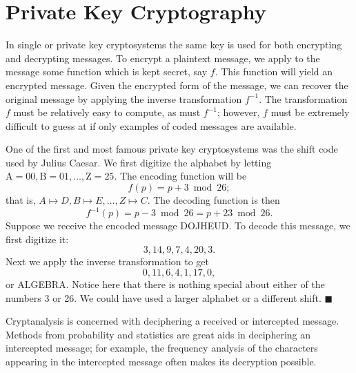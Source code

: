 
 
\section{Private Key Cryptography}
 
 
In {\bfi single\/} or
{\bfi private key
cryptosystems\/}
the same key is used for both encrypting and decrypting messages. To
encrypt a  plaintext message, we apply to the message some function
which is kept secret, say $f$. This function will yield an encrypted
message.  Given the encrypted form of the message, we can recover the
original message by applying the inverse transformation $f^{-1}$. The
transformation $f$ must be relatively easy to compute, as must
$f^{-1}$; however, $f$ must be extremely difficult to guess at if only
examples of coded messages are available.
 
 
\medskip
 
 
One of the first and most famous private key cryptosystems was the
shift code used by Julius Caesar.  We first digitize the alphabet by
letting $\mbox{A}  = 00, \mbox{B}  = 01, \ldots, \mbox{Z} = 25$.
The encoding function will be 
$$
f(p) = p + 3 \bmod 26;
$$
that is, $A \mapsto D, B \mapsto E, \ldots, Z \mapsto C$. The decoding
function is then 
$$
f^{-1}(p) = p - 3 \bmod 26 = p + 23 \bmod 26.
$$
Suppose we receive the encoded message DOJHEUD. To decode this
message, we first digitize it:  
$$
3, 14, 9, 7, 4, 20, 3.
$$
Next we apply the inverse transformation to get
$$
0, 11, 6, 4, 1, 17, 0,
$$
or ALGEBRA. Notice here that there is nothing special about either of
the numbers 3 or 26. We could have used a larger alphabet or a
different shift.
\mbox{\hspace{1in}}
\hspace{\fill} $\blacksquare$
 
 
\medskip
 
 
{\bfi Cryptanalysis\/} is concerned with
deciphering a received or intercepted message. Methods from
probability and statistics are great aids in deciphering an
intercepted message; for example, the frequency analysis of the
characters appearing in the intercepted message often makes its
decryption possible.  
 
 
\medskip
 
